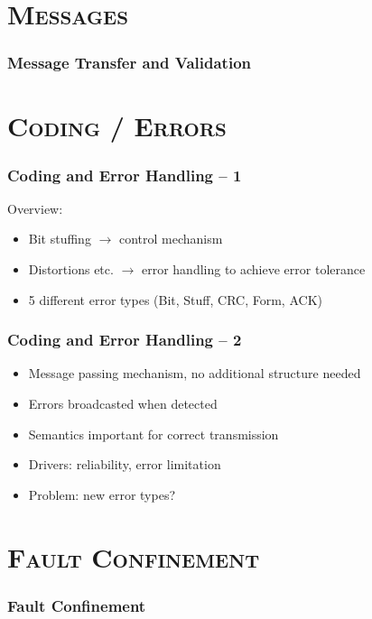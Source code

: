 \documentclass[xcolor=x11names,compress]{beamer}
\renewcommand{\(}{\begin{columns}}
\renewcommand{\)}{\end{columns}}
\newcommand{\<}[1]{\begin{column}{#1}}
\renewcommand{\>}{\end{column}}
\begin{document}
\section{\scshape Messages}
\begin{frame}
  \frametitle{Message Transfer and Validation}

\end{frame}



\section{\scshape Coding / Errors}
\begin{frame}
  \frametitle{Coding and Error Handling -- 1}

  Overview:
  \begin{itemize}
    \item Bit stuffing $\rightarrow$ control mechanism
    \item Distortions etc. $\rightarrow$ error handling to achieve error tolerance
    \item 5 different error types (Bit, Stuff, CRC, Form, ACK)
  \end{itemize}

\end{frame}

\begin{frame}
  \frametitle{Coding and Error Handling -- 2}

  \begin{itemize}
    \item Message passing mechanism, no additional structure needed
    \item Errors broadcasted when detected
    \item Semantics important for correct transmission
    \item Drivers: reliability, error limitation
    \item Problem: new error types?
  \end{itemize}

\end{frame}


\section{\scshape Fault Confinement}
\begin{frame}
  \frametitle{Fault Confinement}

\end{frame}
\end{document}
